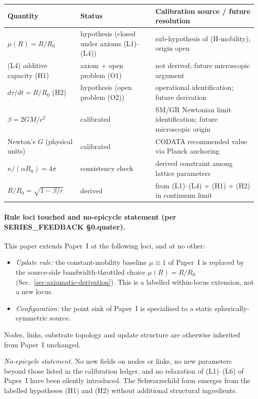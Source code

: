 \documentclass[11pt,a4paper]{article}
\begin{document}
\begin{center}
\begin{tabular}{p{3.4cm}p{3.0cm}p{6.6cm}}
\toprule
Quantity & Status & Calibration source / future resolution \\
\midrule
$\mu(R) = R/R_0$ & hypothesis (closed under axioms (L1)--(L4)) & sub-hypothesis of (H-mobility); origin open \\
(L4) additive capacity (H1) & axiom + open problem (O1) & not derived; future microscopic argument \\
$d\tau/dt = R/R_0$ (H2) & hypothesis (open problem (O2)) & operational identification; future derivation \\
$\beta = 2GM/c^2$ & calibrated & SM/GR Newtonian limit identification; future microscopic origin \\
Newton's $G$ (physical units) & calibrated & CODATA recommended value via Planck anchoring \\
$\kappa/(\alpha R_0) = 4\pi$ & consistency check & derived constraint among lattice parameters \\
$R/R_0 = \sqrt{1-\beta/r}$ & derived & from (L1)--(L4) + (H1) + (H2) in continuum limit \\
\bottomrule
\end{tabular}
\end{center}

\paragraph{Rule loci touched and no-epicycle statement (per SERIES\_FEEDBACK §0.quater).}
This paper extends Paper~I at the following loci, and at no
other:
\begin{itemize}
\item \emph{Update rule:} the constant-mobility baseline
$\mu \equiv 1$ of Paper~I is replaced by the source-side
bandwidth-throttled choice $\mu(R) = R/R_0$ (Sec.~\ref{sec:axiomatic-derivation}).
This is a labelled within-locus extension, not a new locus.
\item \emph{Configuration:} the point sink of Paper~I is
specialised to a static spherically-symmetric source.
\end{itemize}
Nodes, links, substrate topology and update structure are
otherwise inherited from Paper~I unchanged.

\noindent\emph{No-epicycle statement.} No new fields on nodes
or links, no new parameters beyond those listed in the
calibration ledger, and no relaxation of (L1)--(L6) of Paper~I
have been silently introduced. The Schwarzschild form
emerges from the labelled hypotheses (H1) and (H2) without
additional structural ingredients.
\end{document}
